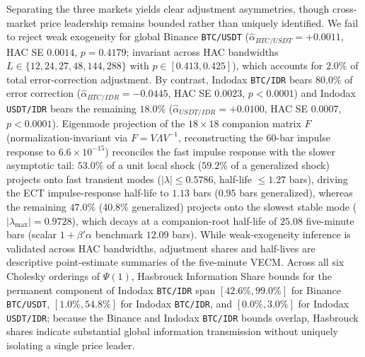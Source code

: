 Separating the three markets yields clear adjustment asymmetries, though cross-market price leadership remains bounded rather than uniquely identified. We fail to reject weak exogeneity for global Binance \texttt{BTC/USDT} ($\hat{\alpha}_{BTC/USDT} = +0.0011$, HAC SE $0.0014$, $p = 0.4179$; invariant across HAC bandwidths $L \in \{12, 24, 27, 48, 144, 288\}$ with $p \in [0.413, 0.425]$), which accounts for $2.0\%$ of total error-correction adjustment. By contrast, Indodax \texttt{BTC/IDR} bears $80.0\%$ of error correction ($\hat{\alpha}_{BTC/IDR} = -0.0445$, HAC SE $0.0023$, $p < 0.0001$) and Indodax \texttt{USDT/IDR} bears the remaining $18.0\%$ ($\hat{\alpha}_{USDT/IDR} = +0.0100$, HAC SE $0.0007$, $p < 0.0001$). Eigenmode projection of the $18 \times 18$ companion matrix $F$ (normalization-invariant via $F = V\Lambda V^{-1}$, reconstructing the 60-bar impulse response to $6.6 \times 10^{-15}$) reconciles the fast impulse response with the slower asymptotic tail: $53.0\%$ of a unit local shock ($59.2\%$ of a generalized shock) projects onto fast transient modes ($|\lambda| \le 0.5786$, half-life $\le 1.27$ bars), driving the ECT impulse-response half-life to $1.13$ bars ($0.95$ bars generalized), whereas the remaining $47.0\%$ ($40.8\%$ generalized) projects onto the slowest stable mode ($|\lambda_{\max}| = 0.9728$), which decays at a companion-root half-life of $25.08$ five-minute bars (scalar $1 + \beta'\alpha$ benchmark $12.09$ bars). While weak-exogeneity inference is validated across HAC bandwidths, adjustment shares and half-lives are descriptive point-estimate summaries of the five-minute VECM. Across all six Cholesky orderings of $\Psi(1)$, Hasbrouck Information Share bounds for the permanent component of Indodax \texttt{BTC/IDR} span $[42.6\%, 99.0\%]$ for Binance \texttt{BTC/USDT}, $[1.0\%, 54.8\%]$ for Indodax \texttt{BTC/IDR}, and $[0.0\%, 3.0\%]$ for Indodax \texttt{USDT/IDR}; because the Binance and Indodax \texttt{BTC/IDR} bounds overlap, Hasbrouck shares indicate substantial global information transmission without uniquely isolating a single price leader.

